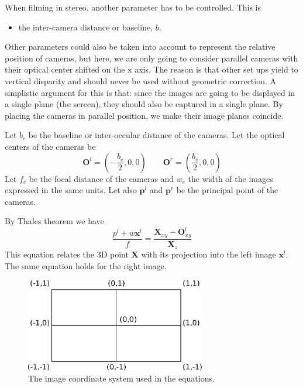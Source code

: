 \documentclass[12pt,a4paper]{article}
\def\x{\mathbf x}
\def\X{\mathbf X}
\def\O{\mathbf O}
\def\p{\mathbf p}
\begin{document}
When filming in stereo, another parameter has to be controlled.  This is
\begin{itemize}
 \item the inter-camera distance or baseline, $b$.
\end{itemize}
Other parameters could also be taken into account to represent the relative position of cameras, but here, we are only going to consider parallel cameras with their optical center shifted on the x axis.  The reason is that other set ups yield to vertical disparity and should never be used without geometric correction.  A simplistic argument for this is that: since the images are going to be displayed in a single plane (the screen), they should also be captured in a single plane.  By placing the cameras in parallel position, we make their image planes coincide.


Let $b_c$ be the baseline or inter-occular distance of the cameras.  Let the optical centers of the cameras be
\begin{equation}
 \O^l = (-\frac{b_c}{2}, 0, 0)  \quad\quad  \O^r = (\frac{b_c}{2}, 0, 0)
\end{equation}
Let $f_c$ be the focal distance of the cameras and $w_c$ the width of the images expressed in the same units.  Let also $\p^l$ and $\p^r$ be the principal point of the cameras.


By Thales theorem we have
\begin{equation}
 \frac{p^l + w \x^l}{f} = \frac{\X_{xy} - \O^l_{xy}}{\X_z}
\end{equation}
This equation relates the 3D point $\X$ with its projection into the left image $\x^l$.  The same equation holds for the right image.


\begin{figure}
 \begin{center}
  \includegraphics[width=0.7\textwidth]{image_coordinate.pdf}
 \end{center}
 \caption{The image coordinate system used in the equations.}
\end{figure}
\end{document}
